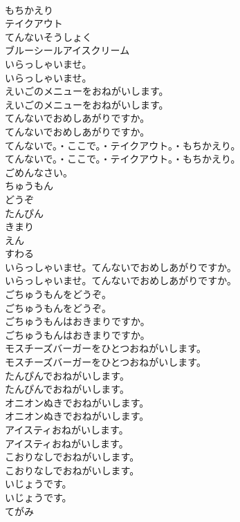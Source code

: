 \documentclass[8pt]{extreport}
\begin{document}
\begin{CJK}{UTF8}{min}
\\	もちかえり
\\	テイクアウト
\\	てんないそうしょく
\\	ブルーシールアイスクリーム
\\	いらっしゃいませ。	
\\	いらっしゃいませ。 
\\	えいごのメニューをおねがいします。	
\\	えいごのメニューをおねがいします。 
\\	てんないでおめしあがりですか。	
\\	てんないでおめしあがりですか。 
\\	てんないで。・ここで。・テイクアウト。・もちかえり。	
\\	てんないで。・ここで。・テイクアウト。・もちかえり。 
\\	ごめんなさい。
\\	ちゅうもん
\\	どうぞ
\\	たんぴん
\\	きまり
\\	えん
\\	すわる
\\	いらっしゃいませ。てんないでおめしあがりですか。	
\\	いらっしゃいませ。てんないでおめしあがりですか。 
\\	ごちゅうもんをどうぞ。	
\\	ごちゅうもんをどうぞ。 
\\	ごちゅうもんはおきまりですか。	
\\	ごちゅうもんはおきまりですか。 
\\	モスチーズバーガーをひとつおねがいします。	
\\	モスチーズバーガーをひとつおねがいします。 
\\	たんぴんでおねがいします。	
\\	たんぴんでおねがいします。 
\\	オニオンぬきでおねがいします。	
\\	オニオンぬきでおねがいします。 
\\	アイスティおねがいします。	
\\	アイスティおねがいします。 
\\	こおりなしでおねがいします。	
\\	こおりなしでおねがいします。 
\\	いじょうです。	
\\	いじょうです。 
\\	てがみ

\end{CJK}
\end{document}
